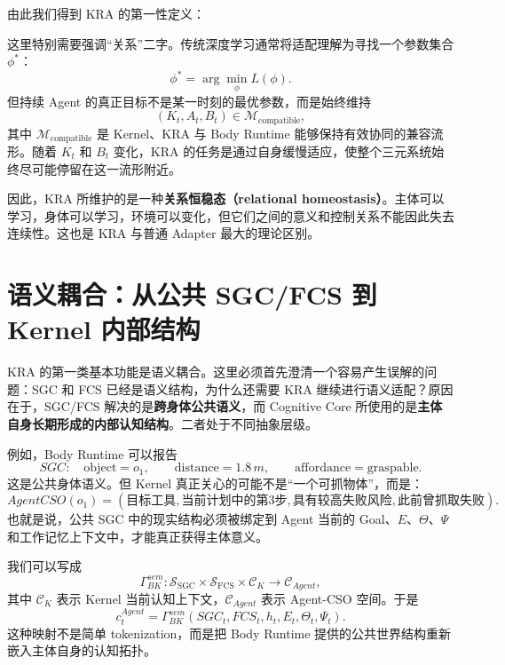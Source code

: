 由此我们得到 KRA 的第一性定义：
\begin{statementbox}
\centering
{}
\end{statementbox}

这里特别需要强调``关系''二字。传统深度学习通常将适配理解为寻找一个参数集合 $\phi^{*}$：
\[
\phi^{*}
=
\arg\min_{\phi}
L(\phi).
\]
但持续 Agent 的真正目标不是某一时刻的最优参数，而是始终维持
\[
\boxed{
(K_t,A_t,B_t)
\in
\mathcal M_{\mathrm{compatible}},
}
\]
其中 $\mathcal M_{\mathrm{compatible}}$ 是 Kernel、KRA 与 Body Runtime 能够保持有效协同的兼容流形。随着 $K_t$ 和 $B_t$ 变化，KRA 的任务是通过自身缓慢适应，使整个三元系统始终尽可能停留在这一流形附近。

因此，KRA 所维护的是一种\textbf{关系恒稳态（relational homeostasis）}。主体可以学习，身体可以学习，环境可以变化，但它们之间的意义和控制关系不能因此失去连续性。这也是 KRA 与普通 Adapter 最大的理论区别。

\section{语义耦合：从公共 SGC/FCS 到 Kernel 内部结构}
\label{sec:kra-semantic-coupling}

KRA 的第一类基本功能是语义耦合。这里必须首先澄清一个容易产生误解的问题：SGC 和 FCS 已经是语义结构，为什么还需要 KRA 继续进行语义适配？原因在于，SGC/FCS 解决的是\textbf{跨身体公共语义}，而 Cognitive Core 所使用的是\textbf{主体自身长期形成的内部认知结构}。二者处于不同抽象层级。

例如，Body Runtime 可以报告
\[
SGC:
\quad
\mathrm{object}=o_1,\qquad
\mathrm{distance}=1.8\,m,\qquad
\mathrm{affordance}=\mathrm{graspable}.
\]
这是公共身体语义。但 Kernel 真正关心的可能不是``一个可抓物体''，而是：
\[
AgentCSO(o_1)
=
\left(
\text{目标工具},
\text{当前计划中的第3步},
\text{具有较高失败风险},
\text{此前曾抓取失败}
\right).
\]
也就是说，公共 SGC 中的现实结构必须被绑定到 Agent 当前的 Goal、$E$、$\Theta$、$\Psi$ 和工作记忆上下文中，才能真正获得主体意义。

我们可以写成
\[
\Gamma_{BK}^{sem}:
\mathcal S_{\mathrm{SGC}}
\times
\mathcal S_{\mathrm{FCS}}
\times
\mathcal C_K
\rightarrow
\mathcal C_{Agent},
\]
其中 $\mathcal C_K$ 表示 Kernel 当前认知上下文，$\mathcal C_{Agent}$ 表示 Agent-CSO 空间。于是
\[
c^{Agent}_t
=
\Gamma_{BK}^{sem}
\left(
SGC_t,
FCS_t,
h_t,
E_t,
\Theta_t,
\Psi_t
\right).
\]
这种映射不是简单 tokenization，而是把 Body Runtime 提供的公共世界结构重新嵌入主体自身的认知拓扑。

